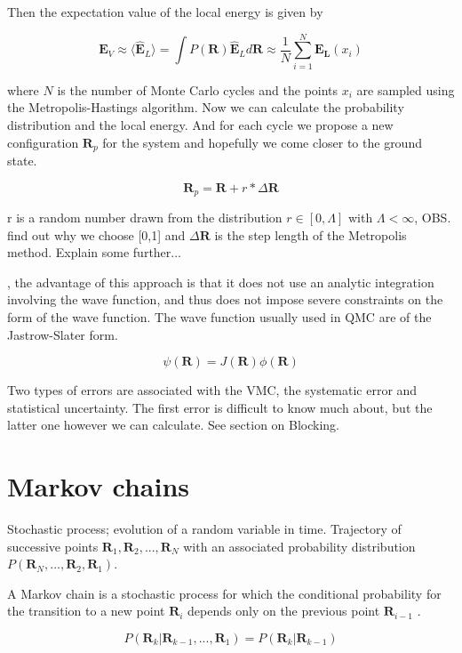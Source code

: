 Then the expectation value of the local energy is given by

$$\mathbf{E}_V \approx \langle \widehat{\mathbf{E}}_L\rangle = \int P(\mathbf{R}) \widehat{\mathbf{E}}_L d\mathbf{R} \approx \frac{1}{N} \sum_{i = 1}^N \mathbf{E_L}(x_i)$$

where $N$ is the number of Monte Carlo cycles and the points $x_i$ are sampled using the Metropolis-Hastings algorithm. Now we can calculate the probability distribution and the local energy. And for each cycle we propose a new configuration $\mathbf{R}_p$ for the system and hopefully we come closer to the ground state.

$$\mathbf{R}_p = \mathbf{R} + r \ast \Delta \mathbf{R}$$

r is a random number drawn from the distribution $r \in [0, \Lambda]$ with $\Lambda < \infty$, OBS. find out why we choose [0,1] and $\Delta \mathbf{R}$ is the step length of the Metropolis method. Explain some further... 

\cite{toulouse2016introduction}, the advantage of this approach is that it does not use an analytic integration involving the wave function, and thus does not impose severe constraints on the form of the wave function. 
The wave function usually used in QMC are of the Jastrow-Slater form. 

\begin{equation}
\psi(\mathbf{R}) = J(\mathbf{R}) \phi (\mathbf{R})
\end{equation}

Two types of errors are associated with the VMC, the systematic error and  statistical uncertainty. The first error is difficult to know much about, but the latter one however we can calculate. See section on Blocking.

\section{Markov chains}
Stochastic process; evolution of a random variable in time. Trajectory of successive points $\mathbf{R}_1, \mathbf{R}_2, ...,\mathbf{R}_N$ with an associated probability distribution $P(\mathbf{R}_N, ...,\mathbf{R}_2,\mathbf{R}_1)$.  

A Markov chain is a stochastic process for which the conditional probability for the transition to a new point $\mathbf{R}_i$ depends only on the previous point $\mathbf{R}_{i-1}$ \cite{toulouse2016introduction}. 

\begin{equation}
P(\mathbf{R}_k|\mathbf{R}_{k-1}, ...,\mathbf{R}_1) = P(\mathbf{R}_k|\mathbf{R}_{k-1})
\end{equation}

